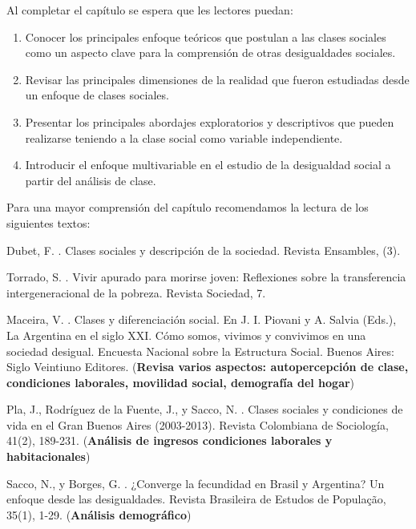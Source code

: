 \documentclass[
]{book}
\providecommand{\tightlist}{%
  \setlength{\itemsep}{0pt}\setlength{\parskip}{0pt}}
\begin{document}
Al completar el capítulo se espera que les lectores puedan:

\begin{enumerate}
\def\labelenumi{\arabic{enumi}.}
\tightlist
\item
  Conocer los principales enfoque teóricos que postulan a las clases sociales como un aspecto clave para la comprensión de otras desigualdades sociales.\\
\item
  Revisar las principales dimensiones de la realidad que fueron estudiadas desde un enfoque de clases sociales.\\
\item
  Presentar los principales abordajes exploratorios y descriptivos que pueden realizarse teniendo a la clase social como variable independiente.\\
\item
  Introducir el enfoque multivariable en el estudio de la desigualdad social a partir del análisis de clase.
\end{enumerate}

Para una mayor comprensión del capítulo recomendamos la lectura de los siguientes textos:

Dubet, F. \citeyearpar{Dubet2015}. Clases sociales y descripción de la sociedad. Revista Ensambles, (3).

Torrado, S. \citeyearpar{Torrado1995}. Vivir apurado para morirse joven: Reflexiones sobre la transferencia intergeneracional de la pobreza. Revista Sociedad, 7.

Maceira, V. \citeyearpar{Maceira2018}. Clases y diferenciación social. En J. I. Piovani y A. Salvia (Eds.), La Argentina en el siglo XXI. Cómo somos, vivimos y convivimos en una sociedad desigual. Encuesta Nacional sobre la Estructura Social. Buenos Aires: Siglo Veintiuno Editores. (\textbf{Revisa varios aspectos: autopercepción de clase, condiciones laborales, movilidad social, demografía del hogar})

Pla, J., Rodríguez de la Fuente, J., y Sacco, N. \citeyearpar{Pla.etal2018}. Clases sociales y condiciones de vida en el Gran Buenos Aires (2003-2013). Revista Colombiana de Sociología, 41(2), 189-231. (\textbf{Análisis de ingresos condiciones laborales y habitacionales})

Sacco, N., y Borges, G. \citeyearpar{Sacco2018}. ¿Converge la fecundidad en Brasil y Argentina? Un enfoque desde las desigualdades. Revista Brasileira de Estudos de População, 35(1), 1-29. (\textbf{Análisis demográfico})
\end{document}

